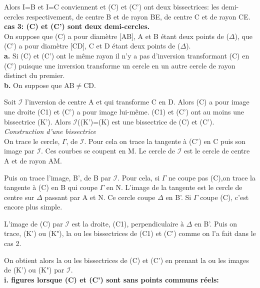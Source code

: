 \documentclass[a4paper, 12pt, twoside]{book}
\begin{document}
 Alors I=B et I=C conviennent et (C) et (C') ont deux bissectrices: les demi-cercles respectivement, de centre B et de rayon BE,  de centre C et de rayon CE.\\
 
 \textbf{cas 3: (C) et (C') sont deux demi-cercles.}\\


On suppose que (C) a pour diamètre [AB], A et B étant deux points de ($\Delta$),  que (C') a pour diamètre [CD], C et D étant deux points de ($\Delta$).\\

\textbf{a.} Si (C) et (C') ont le même rayon il n'y a pas d'inversion transformant (C) en (C') puisque une inversion transforme un cercle en un autre cercle de rayon distinct du premier.\\

\textbf{b.} On suppose que AB$\neq$CD.\

 Soit $\mathcal{I}$ l'inversion de centre A et qui transforme C en D. Alors (C) a pour image une droite (C1) et (C') a pour image lui-même. (C1) et (C') ont au moins une bissectrice (K'). Alors $\mathcal{I}$((K')=(K) est une  bissectrice de (C) et (C').\\
 
\newpage  \textit{Construction d'une bissectrice}\\

 
 
 On trace le cercle, $\Gamma$, de $\mathcal{I}$. Pour cela on trace la tangente à (C') en C puis son image par $\mathcal{I}$. Ces courbes se coupent en M. Le cercle de $\mathcal{I}$ est le cercle de centre A et de rayon AM.\
 
 Puis on trace l'image, B', de B par  $\mathcal{I}$. Pour cela, si $\Gamma$ ne coupe pas (C),on trace la tangente à (C) en B qui coupe $\Gamma$ en N. L'image de la tangente est le cercle de centre sur $\Delta$ passant par A et N. Ce cercle coupe $\Delta$ en B'. Si $\Gamma$ coupe (C), c'est encore plus simple.\
 
 L'image de (C) par $\mathcal{I}$ est la droite, (C1), perpendiculaire à $\Delta$ en B'. Puis on trace, (K') ou (K"), la ou les bissectrices de (C1) et (C') comme on l'a fait dans le cas 2.\
 
 On obtient alors la ou les bissectrices de (C) et (C') en prenant la ou les images de (K') ou (K") par $\mathcal{I}$.\\
 
  
 \textbf{i. figures lorsque (C) et (C') sont sans points communs réels:}\\
 
\end{document}
